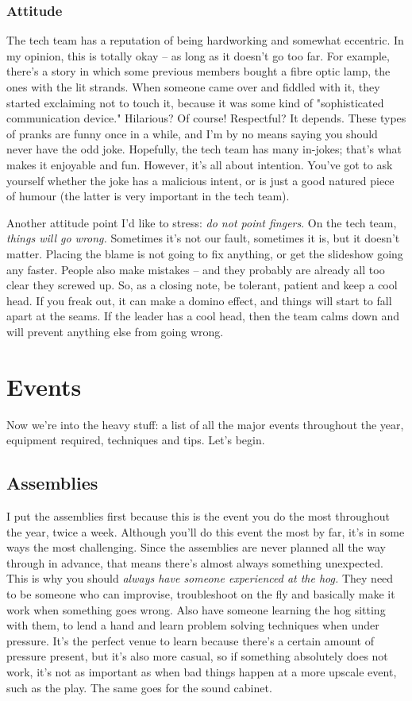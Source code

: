 \documentclass[letterpaper,10pt,oneside,headsepline]{scrreprt}
\begin{document}
\subsection{Attitude}
The tech team has a reputation of being hardworking and somewhat eccentric. In my opinion, this is totally okay -- as long as it doesn't go too far. For example, there's a story in which some previous members bought a fibre optic lamp, the ones with the lit strands. When someone came over and fiddled with it, they started exclaiming not to touch it, because it was some kind of "sophisticated communication device." Hilarious? Of course! Respectful? It depends. These types of pranks are funny once in a while, and I'm by no means saying you should never have the odd joke. Hopefully, the tech team has many in-jokes; that's what makes it enjoyable and fun. However, it's all about intention. You've got to ask yourself whether the joke has a malicious intent, or is just a good natured piece of humour (the latter is very important in the tech team).

Another attitude point I'd like to stress: \textit{do not point fingers}. On the tech team, \textit{things will go wrong.} Sometimes it's not our fault, sometimes it is, but it doesn't matter. Placing the blame is not going to fix anything, or get the slideshow going any faster. People also make mistakes -- and they probably are already all too clear they screwed up. So, as a closing note, be tolerant, patient and keep a cool head. If you freak out, it can make a domino effect, and things will start to fall apart at the seams. If the leader has a cool head, then the team calms down and will prevent anything else from going wrong.
\chapter{Events}
Now we're into the heavy stuff: a list of all the major events throughout the year, equipment required, techniques and tips. Let's begin.
\section{Assemblies}
I put the assemblies first because this is the event you do the most throughout the year, twice a week. Although you'll do this event the most by far, it's in some ways the most challenging. Since the assemblies are never planned all the way through in advance, that means there's almost always something unexpected. This is why you should \textit{always have someone experienced at the hog.} They need to be someone who can improvise, troubleshoot on the fly and basically make it work when something goes wrong. Also have someone learning the hog sitting with them, to lend a hand and learn problem solving techniques when under pressure. It's the perfect venue to learn because there's a certain amount of pressure present, but it's also more casual, so if something absolutely does not work, it's not as important as when bad things happen at a more upscale event, such as the play. The same goes for the sound cabinet. 
\end{document}

